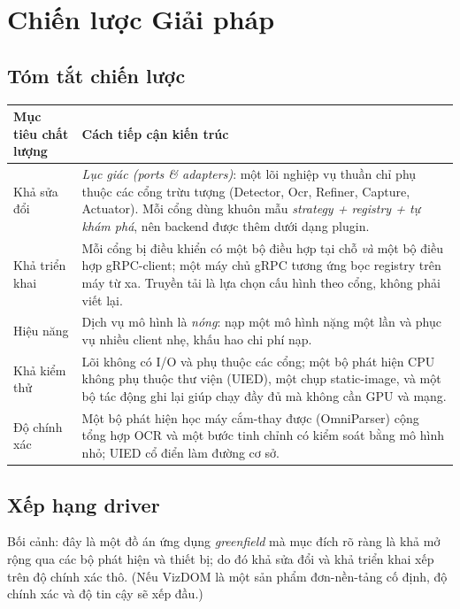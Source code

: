 \documentclass[11pt,a4paper]{report}
\begin{document}
\chapter{Chiến lược Giải pháp}
\section{Tóm tắt chiến lược}
\begin{longtable}{@{}p{3.4cm}p{11.2cm}@{}}
\toprule
\textbf{Mục tiêu chất lượng} & \textbf{Cách tiếp cận kiến trúc} \\
\midrule
\endhead
Khả sửa đổi & \emph{Lục giác (ports \& adapters)}: một lõi nghiệp vụ thuần chỉ phụ thuộc các cổng trừu tượng (Detector, Ocr, Refiner, Capture, Actuator). Mỗi cổng dùng khuôn mẫu \emph{strategy + registry + tự khám phá}, nên backend được thêm dưới dạng plugin. \\
Khả triển khai & Mỗi cổng bị điều khiển có một bộ điều hợp tại chỗ \emph{và} một bộ điều hợp gRPC-client; một máy chủ gRPC tương ứng bọc registry trên máy từ xa. Truyền tải là lựa chọn cấu hình theo cổng, không phải viết lại. \\
Hiệu năng & Dịch vụ mô hình là \emph{nóng}: nạp một mô hình nặng một lần và phục vụ nhiều client nhẹ, khấu hao chi phí nạp. \\
Khả kiểm thử & Lõi không có I/O và phụ thuộc các cổng; một bộ phát hiện CPU không phụ thuộc thư viện (UIED), một chụp static-image, và một bộ tác động ghi lại giúp chạy đầy đủ mà không cần GPU và mạng. \\
Độ chính xác & Một bộ phát hiện học máy cắm-thay được (OmniParser) cộng tổng hợp OCR và một bước tinh chỉnh có kiểm soát bằng mô hình nhỏ; UIED cổ điển làm đường cơ sở. \\
\bottomrule
\end{longtable}

\section{Xếp hạng driver}
Bối cảnh: đây là một đồ án ứng dụng \emph{greenfield} mà mục đích rõ ràng là khả mở
rộng qua các bộ phát hiện và thiết bị; do đó khả sửa đổi và khả triển khai xếp trên
độ chính xác thô. (Nếu VizDOM là một sản phẩm đơn-nền-tảng cố định, độ chính xác và
độ tin cậy sẽ xếp đầu.)
\end{document}
